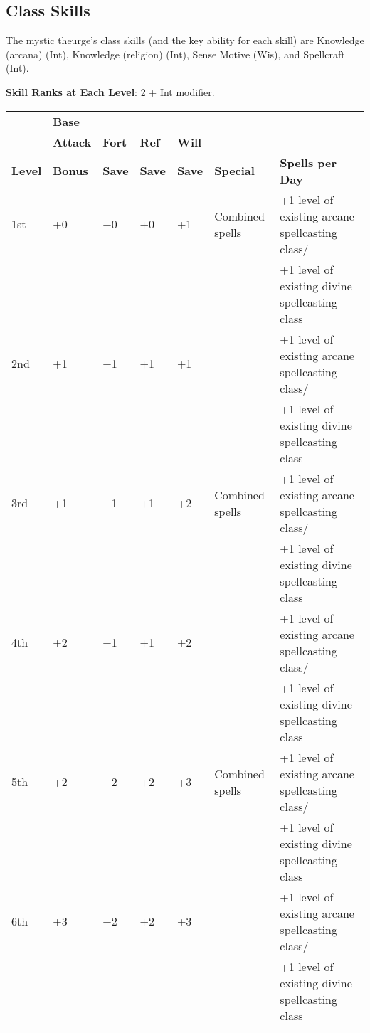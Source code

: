 \subsection{Class Skills}

				
The mystic theurge's class skills (and the key ability for each skill) are Knowledge (arcana) (Int), Knowledge (religion) (Int), Sense Motive (Wis), and Spellcraft (Int). 
				
\textbf{ Skill Ranks at Each Level}: 2 + Int modifier.
				

\begin{table*}[]
\sffamily
\caption{Table: Mystic Theurge}
\begin{tabular}{lllllll}
      & \textbf{Base} & & & & & \\ 
      & \textbf{Attack} & \textbf{Fort} & \textbf{Ref} & \textbf{Will} & & \\
\textbf{Level} & \textbf{Bonus }& \textbf{Save }&\textbf{ Save }& \textbf{Save }& \textbf{Special }& \textbf{Spells per Day}\\
1st & +0 & +0 & +0 & +1 & Combined spells & +1 level of existing arcane spellcasting class/\\
    &    &    &    &    &                 & +1 level of existing divine spellcasting class\\
2nd & +1 & +1 & +1 & +1 &  & +1 level of existing arcane spellcasting class/\\
    &    &    &    &    &                 & +1 level of existing divine spellcasting class\\
3rd & +1 & +1 & +1 & +2 & Combined spells & +1 level of existing arcane spellcasting class/\\
    &    &    &    &    &                 & +1 level of existing divine spellcasting class\\
4th & +2 & +1 & +1 & +2 &  & +1 level of existing arcane spellcasting class/\\
    &    &    &    &    &                 & +1 level of existing divine spellcasting class\\
5th & +2 & +2 & +2 & +3 & Combined spells & +1 level of existing arcane spellcasting class/\\
    &    &    &    &    &                 & +1 level of existing divine spellcasting class\\
6th & +3 & +2 & +2 & +3 &  & +1 level of existing arcane spellcasting class/\\
    &    &    &    &    &                 & +1 level of existing divine spellcasting class\\

\end{tabular}
\end{table*}
